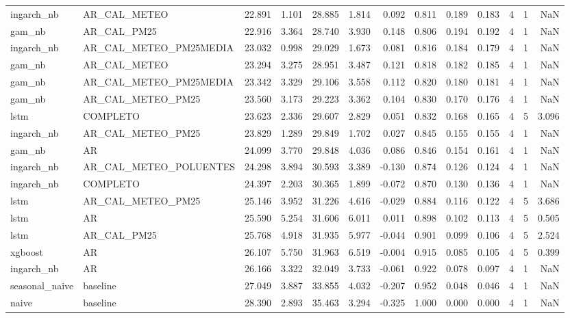 \begin{tabular}{llrrrrrrrrrrr}
ingarch_nb & AR_CAL_METEO & 22.891 & 1.101 & 28.885 & 1.814 & 0.092 & 0.811 & 0.189 & 0.183 & 4 & 1 & NaN \\
gam_nb & AR_CAL_PM25 & 22.916 & 3.364 & 28.740 & 3.930 & 0.148 & 0.806 & 0.194 & 0.192 & 4 & 1 & NaN \\
ingarch_nb & AR_CAL_METEO_PM25MEDIA & 23.032 & 0.998 & 29.029 & 1.673 & 0.081 & 0.816 & 0.184 & 0.179 & 4 & 1 & NaN \\
gam_nb & AR_CAL_METEO & 23.294 & 3.275 & 28.951 & 3.487 & 0.121 & 0.818 & 0.182 & 0.185 & 4 & 1 & NaN \\
gam_nb & AR_CAL_METEO_PM25MEDIA & 23.342 & 3.329 & 29.106 & 3.558 & 0.112 & 0.820 & 0.180 & 0.181 & 4 & 1 & NaN \\
gam_nb & AR_CAL_METEO_PM25 & 23.560 & 3.173 & 29.223 & 3.362 & 0.104 & 0.830 & 0.170 & 0.176 & 4 & 1 & NaN \\
lstm & COMPLETO & 23.623 & 2.336 & 29.607 & 2.829 & 0.051 & 0.832 & 0.168 & 0.165 & 4 & 5 & 3.096 \\
ingarch_nb & AR_CAL_METEO_PM25 & 23.829 & 1.289 & 29.849 & 1.702 & 0.027 & 0.845 & 0.155 & 0.155 & 4 & 1 & NaN \\
gam_nb & AR & 24.099 & 3.770 & 29.848 & 4.036 & 0.086 & 0.846 & 0.154 & 0.161 & 4 & 1 & NaN \\
ingarch_nb & AR_CAL_METEO_POLUENTES & 24.298 & 3.894 & 30.593 & 3.389 & -0.130 & 0.874 & 0.126 & 0.124 & 4 & 1 & NaN \\
ingarch_nb & COMPLETO & 24.397 & 2.203 & 30.365 & 1.899 & -0.072 & 0.870 & 0.130 & 0.136 & 4 & 1 & NaN \\
lstm & AR_CAL_METEO_PM25 & 25.146 & 3.952 & 31.226 & 4.616 & -0.029 & 0.884 & 0.116 & 0.122 & 4 & 5 & 3.686 \\
lstm & AR & 25.590 & 5.254 & 31.606 & 6.011 & 0.011 & 0.898 & 0.102 & 0.113 & 4 & 5 & 0.505 \\
lstm & AR_CAL_PM25 & 25.768 & 4.918 & 31.935 & 5.977 & -0.044 & 0.901 & 0.099 & 0.106 & 4 & 5 & 2.524 \\
xgboost & AR & 26.107 & 5.750 & 31.963 & 6.519 & -0.004 & 0.915 & 0.085 & 0.105 & 4 & 5 & 0.399 \\
ingarch_nb & AR & 26.166 & 3.322 & 32.049 & 3.733 & -0.061 & 0.922 & 0.078 & 0.097 & 4 & 1 & NaN \\
seasonal_naive & baseline & 27.049 & 3.887 & 33.855 & 4.032 & -0.207 & 0.952 & 0.048 & 0.046 & 4 & 1 & NaN \\
naive & baseline & 28.390 & 2.893 & 35.463 & 3.294 & -0.325 & 1.000 & 0.000 & 0.000 & 4 & 1 & NaN \\
\bottomrule
\end{tabular}
